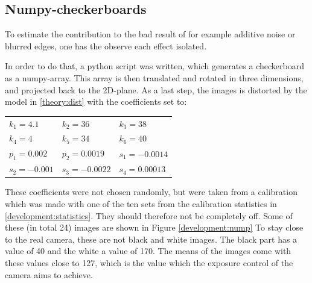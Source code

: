 \subsection{Numpy-checkerboards\label{development:checker}}  
To estimate the contribution to the bad result of for example additive noise or blurred edges, one has the observe each effect isolated.

In order to do that, a python script was written, which generates a checkerboard as a numpy-array.
This array is then translated and rotated in three dimensions, and projected back to the 2D-plane.
As a last step, the images is distorted by the model in \ref{theory:dist} with the coefficients set to:
\begin{center}
	\begin{tabular}{lll}
		$k_1 = 4.1$   &$k_2 = 36$     &$k_3 = 38$\\
		$k_4 = 4$     &$k_5 = 34$     &$k_6 = 40$\\
		$p_1 = 0.002$ &$p_2 = 0.0019$ &$s_1 = -0.0014$\\
		$s_2 = -0.001$&$s_3 = -0.0022$&$s_4 = 0.00013$	
	\end{tabular} 
\end{center}
These coefficients were not chosen randomly, but were taken from a calibration which was made with one of the ten sets from the calibration statistics in \ref{development:statistics}.
They should therefore not be completely off.
Some of these (in total 24) images are shown in Figure \ref{development:nump}
To stay close to the real camera, these are not black and white images.
The black part has a value of 40 and the white a value of 170.
The means of the images come with these values close to 127, which is the value which the exposure control of the camera aims to achieve.

